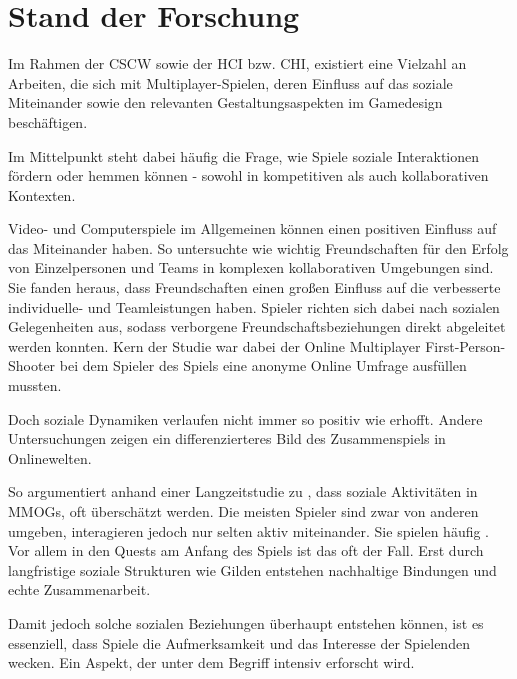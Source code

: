 \chapter{Stand der Forschung}\label{sec:related-works}

Im Rahmen der \ac{CSCW} sowie der \ac{HCI} bzw. \ac{CHI}, existiert eine Vielzahl an Arbeiten, die sich mit Multiplayer-Spielen, deren Einfluss auf das soziale Miteinander sowie den relevanten Gestaltungsaspekten im Gamedesign beschäftigen.

Im Mittelpunkt steht dabei häufig die Frage, wie Spiele soziale Interaktionen fördern oder hemmen können - sowohl in kompetitiven als auch kollaborativen Kontexten.

Video- und Computerspiele im Allgemeinen können einen positiven Einfluss auf das Miteinander haben. So untersuchte \cite{mason_friends_2013} wie wichtig Freundschaften für den Erfolg von Einzelpersonen und Teams in komplexen kollaborativen Umgebungen sind. Sie fanden heraus, dass Freundschaften einen großen Einfluss auf die verbesserte individuelle- und Teamleistungen haben. Spieler richten sich dabei nach sozialen Gelegenheiten aus, sodass verborgene Freundschaftsbeziehungen direkt abgeleitet werden konnten. Kern der Studie war dabei der Online Multiplayer First-Person-Shooter  bei dem Spieler des Spiels eine anonyme Online Umfrage ausfüllen mussten. 

Doch soziale Dynamiken verlaufen nicht immer so positiv wie erhofft. Andere Untersuchungen zeigen ein differenzierteres Bild des Zusammenspiels in Onlinewelten.

So argumentiert \cite{ducheneaut_alone_2006} anhand einer Langzeitstudie zu , dass soziale Aktivitäten in \ac{MMOG}s, oft überschätzt werden. Die meisten Spieler sind zwar von anderen umgeben, interagieren jedoch nur selten aktiv miteinander. Sie spielen häufig . Vor allem in den Quests am Anfang des Spiels ist das oft der Fall. Erst durch langfristige soziale Strukturen wie Gilden entstehen nachhaltige Bindungen und echte Zusammenarbeit.

Damit jedoch solche sozialen Beziehungen überhaupt entstehen können, ist es essenziell, dass Spiele die Aufmerksamkeit und das Interesse der Spielenden wecken. Ein Aspekt, der unter dem Begriff  intensiv erforscht wird.


